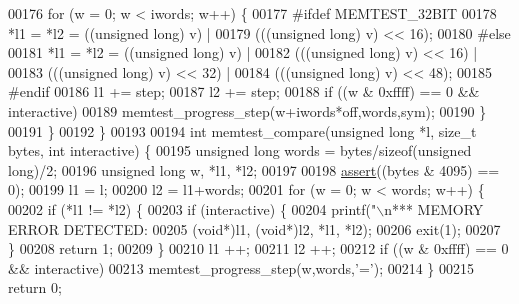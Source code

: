 \begin{DoxyCode}
{{{00176         \textcolor{keywordflow}{for} (w = 0; w < iwords; w++) \{
00177 \textcolor{preprocessor}{#}\textcolor{preprocessor}{ifdef} \textcolor{preprocessor}{MEMTEST\_32BIT}
00178             *l1 = *l2 = ((\textcolor{keywordtype}{unsigned} \textcolor{keywordtype}{long})     v) |
00179                         (((\textcolor{keywordtype}{unsigned} \textcolor{keywordtype}{long})    v) << 16);
00180 \textcolor{preprocessor}{#}\textcolor{preprocessor}{else}
00181             *l1 = *l2 = ((\textcolor{keywordtype}{unsigned} \textcolor{keywordtype}{long})     v) |
00182                         (((\textcolor{keywordtype}{unsigned} \textcolor{keywordtype}{long})    v) << 16) |
00183                         (((\textcolor{keywordtype}{unsigned} \textcolor{keywordtype}{long})    v) << 32) |
00184                         (((\textcolor{keywordtype}{unsigned} \textcolor{keywordtype}{long})    v) << 48);
00185 \textcolor{preprocessor}{#}\textcolor{preprocessor}{endif}
00186             l1 += step;
00187             l2 += step;
00188             \textcolor{keywordflow}{if} ((w & 0xffff) == 0 && interactive)
00189                 memtest\_progress\_step(w+iwords*off,words,sym);
00190         \}
00191     \}
00192 \}
00193 
00194 \textcolor{keywordtype}{int} memtest\_compare(\textcolor{keywordtype}{unsigned} \textcolor{keywordtype}{long} *l, size\_t bytes, \textcolor{keywordtype}{int} interactive) \{
00195     \textcolor{keywordtype}{unsigned} \textcolor{keywordtype}{long} words = bytes/\textcolor{keyword}{sizeof}(\textcolor{keywordtype}{unsigned} \textcolor{keywordtype}{long})/2;
00196     \textcolor{keywordtype}{unsigned} \textcolor{keywordtype}{long} w, *l1, *l2;
00197 
00198     \hyperlink{redisassert_8h_a993abaa2c168852c1592879472938781}{assert}((bytes & 4095) == 0);
00199     l1 = l;
00200     l2 = l1+words;
00201     \textcolor{keywordflow}{for} (w = 0; w < words; w++) \{
00202         \textcolor{keywordflow}{if} (*l1 != *l2) \{
00203             \textcolor{keywordflow}{if} (interactive) \{
00204                 printf(\textcolor{stringliteral}{"\(\backslash\)n*** MEMORY ERROR DETECTED: %
00205                     (\textcolor{keywordtype}{void}*)l1, (\textcolor{keywordtype}{void}*)l2, *l1, *l2);
00206                 exit(1);
00207             \}
00208             \textcolor{keywordflow}{return} 1;
00209         \}
00210         l1 ++;
00211         l2 ++;
00212         \textcolor{keywordflow}{if} ((w & 0xffff) == 0 && interactive)
00213             memtest\_progress\_step(w,words,\textcolor{stringliteral}{'='});
00214     \}
00215     \textcolor{keywordflow}{return} 0;
}}}}
\end{DoxyCode}
